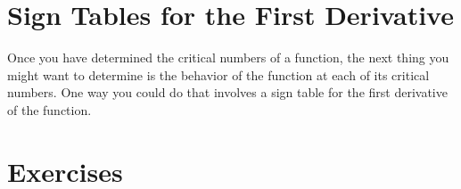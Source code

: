 \documentclass[12pt,]{book}
\theoremstyle{plain}
\theoremstyle{definition}
\numberwithin{equation}{section}
\begin{document}
\typeout{************************************************}
\typeout{************************************************}
\section[Sign Tables for the First Derivative]{Sign Tables for the First Derivative}\label{section-sign-tables-for-the-first-derivative}
Once you have determined the critical numbers of a function, the next thing you might want to determine is the behavior of the function at each of its critical numbers.  One way you could do that involves a sign table for the first derivative of the function.%
\typeout{************************************************}
\typeout{************************************************}
\section*{Exercises}\label{exercises-49}
\end{document}
